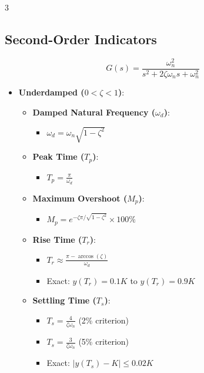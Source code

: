 \documentclass[letterpaper,10pt]{article}
\begin{document}
\begin{multicols}{3}
\subsection*{Second-Order Indicators}
\[
G(s) = \frac{\omega_n^2}{s^2 + 2\zeta\omega_n s + \omega_n^2}
\]
\begin{itemize}[leftmargin=*]
    \item \textbf{Underdamped (\(0 < \zeta <1\))}:
    \begin{itemize}[leftmargin=*]
        \item \textbf{Damped Natural Frequency (\(\omega_d\))}: 
        \begin{itemize}[leftmargin=*]
            \item \( \omega_d = \omega_n\sqrt{1-\zeta^2} \)
        \end{itemize}
        
        \item \textbf{Peak Time (\(T_p\))}:
        \begin{itemize}[leftmargin=*]
                \item \( T_p = \frac{\pi}{\omega_d} \)
        \end{itemize}
        
        \item \textbf{Maximum Overshoot (\(M_p\))}:
        \begin{itemize}[leftmargin=*]
                \item \( M_p = e^{-\zeta\pi/\sqrt{1-\zeta^2}} \times 100\% \)
        \end{itemize}
        
        \item \textbf{Rise Time (\(T_r\))}:
        \begin{itemize}[leftmargin=*]
                \item \( T_r \approx \frac{\pi - \arccos(\zeta)}{\omega_d} \)
                \item Exact:  \( y(T_r) = 0.1K \) to \( y(T_r) = 0.9K \)
        \end{itemize}
        
        \item \textbf{Settling Time (\(T_s\))}:
        \begin{itemize}[leftmargin=*]
                \item \( T_s = \frac{4}{\zeta\omega_n} \) (2\% criterion)
                \item \( T_s = \frac{3}{\zeta\omega_n} \) (5\% criterion)
                \item Exact: \( |y(T_s) - K| \leq 0.02K \)
        \end{itemize}
    \end{itemize}
    

\end{itemize}
\end{multicols}
\end{document}
